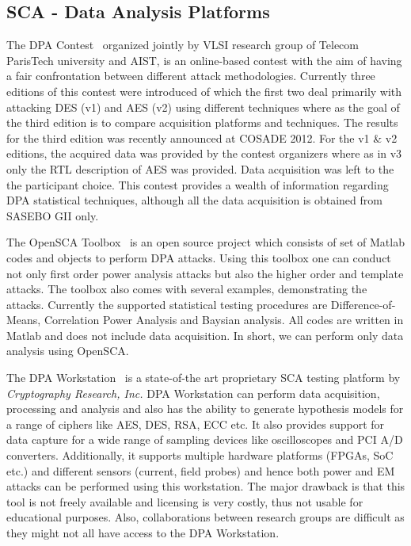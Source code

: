 \documentclass{llncs}
\numberwithin{algorithm}{chapter}
\begin{document}
\subsection{SCA - Data Analysis Platforms}\label{sec:SCAplat}
The DPA Contest~\cite{2023} organized jointly by VLSI research group of Telecom ParisTech university and AIST,
is an online-based contest with the aim of having a fair confrontation between different attack methodologies. 
Currently
three editions of this contest were introduced of which the first two deal primarily with
attacking DES (v1) and AES (v2) using different techniques where as the goal of the third edition is to
compare acquisition platforms and techniques. The results for the third edition was recently announced 
at COSADE 2012. For the v1 \& v2 editions, the acquired data was provided by the contest
organizers where as in v3 only the RTL description of AES was provided. Data acquisition was left to the 
the participant choice.  This contest provides a wealth of information regarding DPA statistical techniques,
although all the data acquisition is obtained from SASEBO GII only. 

The OpenSCA Toolbox~\cite{2022} is an open source project which consists of set of Matlab codes and objects
to perform DPA attacks. Using this toolbox one can conduct  not only first order power analysis attacks
but also the higher order and template attacks. The toolbox also comes with several examples, demonstrating
the attacks. Currently the supported statistical testing procedures are Difference-of-Means, 
Correlation Power Analysis and Baysian analysis. All codes are written in Matlab and does not
include data acquisition. In short, we can perform only data analysis using OpenSCA.  

The DPA Workstation\texttrademark~\cite{2024} is a state-of-the art proprietary SCA testing  
platform by \emph{Cryptography Research, Inc.} DPA Workstation\texttrademark
can perform data acquisition, processing and analysis and also has the ability to
generate hypothesis models for a range of ciphers like AES, DES, RSA, ECC etc. It also provides 
support for data capture for a wide range of sampling devices like oscilloscopes and
PCI A/D converters. Additionally, it supports multiple hardware platforms (FPGAs, SoC etc.) and different
sensors (current, field probes) and hence both power and EM attacks can be performed using this workstation.
The major drawback is that this tool is not freely available and licensing is very costly, thus 
not usable for educational purposes. Also, collaborations between research groups are difficult as they
might not all have access to the DPA Workstation\texttrademark.
\end{document}
